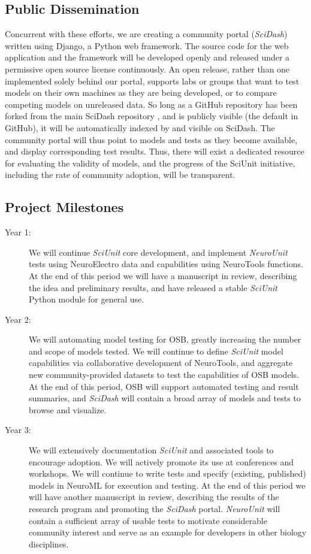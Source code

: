 \documentclass[11pt,letterpaper]{article}
\begin{document}
\subsection{Public Dissemination}
Concurrent with these efforts, we are creating a community portal (\textit{SciDash}) written using Django, a Python web framework.  The source code for the web application and the framework will be developed openly and released under a permissive open source license continuously. An open release, rather than one implemented solely behind our portal, supports labs or groups that want to test models on their own machines as they are being developed, or to compare competing models on unreleased data.  So long as a GitHub repository has been forked from the main SciDash repository \cite{scidash_repo_url}, and is publicly visible (the default in GitHub), it will be automatically indexed by and visible on SciDash. The community portal will thus point to models and tests as they become available, and display corresponding test results.  Thus, there will exist a dedicated resource for evaluating the validity of models, and the progress of the SciUnit initiative, including the rate of community adoption, will be transparent.  

\subsection{Project Milestones}
\begin{description}
\item[Year 1:] We will continue \textit{SciUnit} core development, and implement \textit{NeuroUnit} tests using NeuroElectro data and capabilities using NeuroTools functions.  At the end of this period we will have a manuscript in review, describing the idea and preliminary results, and have released a stable \textit{SciUnit} Python module for general use. 
\item[Year 2:] We will automating model testing for OSB, greatly increasing the number and scope of models tested.  We will continue to define \textit{SciUnit} model capabilities via collaborative development of NeuroTools, and aggregate new community-provided datasets to test the capabilities of OSB models.  At the end of this period, OSB will support automated testing and result summaries, and \textit{SciDash} will contain a broad array of models and tests to browse and visualize.  
\item[Year 3:] We will extensively documentation \textit{SciUnit} and associated tools to encourage adoption.  We will actively promote its use at conferences and workshops.  We will continue to write tests and specify (existing, published) models in NeuroML for execution and testing. At the end of this period we will have another manuscript in review, describing the results of the research program and promoting the \textit{SciDash} portal.  \textit{NeuroUnit} will contain a sufficient array of usable tests to motivate considerable community interest and serve as an example for developers in other biology disciplines.  
\end{description}
\end{document}
